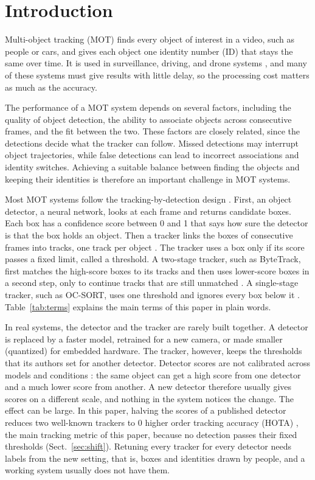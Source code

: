 \section{Introduction}\label{sec:intro}

Multi-object tracking (MOT) finds every object of interest in a video, such as people or cars,
and gives each object one identity number (ID) that stays the same over time. It is used in
surveillance, driving, and drone systems \cite{zhu2022visdrone,wu2022uavsurvey}, and many of these
systems must give results with little delay, so the processing cost matters as much as the
accuracy.

The performance of a MOT system depends on several factors, including the quality of object
detection, the ability to associate objects across consecutive frames, and the fit between the two.
These factors are closely related, since the detections decide what the tracker can follow. Missed
detections may interrupt object trajectories, while false detections can lead to incorrect
associations and identity switches. Achieving a suitable balance between finding the objects and
keeping their identities is therefore an important challenge in MOT systems.

Most MOT systems follow the tracking-by-detection design \cite{adzemovic2026survey}. First, an
object detector, a neural network, looks at each frame and returns candidate boxes. Each box has a
confidence score between 0 and 1 that says how sure the detector is that the box holds an object.
Then a tracker links the boxes of consecutive frames into tracks, one track per object
\cite{bewley2016sort,zhang2022bytetrack,cao2023ocsort}. The tracker uses a box only if its score
passes a fixed limit, called a threshold. A two-stage tracker, such as ByteTrack, first matches the
high-score boxes to its tracks and then uses lower-score boxes in a second step, only to continue
tracks that are still unmatched \cite{zhang2022bytetrack}. A single-stage tracker, such as OC-SORT,
uses one threshold and ignores every box below it \cite{cao2023ocsort}. Table~\ref{tab:terms}
explains the main terms of this paper in plain words.

In real systems, the detector and the tracker are rarely built together. A detector is replaced by
a faster model, retrained for a new camera, or made smaller (quantized) for embedded hardware. The
tracker, however, keeps the thresholds that its authors set for another detector. Detector scores
are not calibrated across models and conditions \cite{kuppers2020detcalib}: the same object can get
a high score from one detector and a much lower score from another. A new detector therefore
usually gives scores on a different scale, and nothing in the system notices the change. The effect
can be large. In this paper, halving the scores of a published detector reduces two well-known
trackers to 0 higher order tracking accuracy (HOTA) \cite{luiten2021hota}, the main tracking metric
of this paper, because no detection passes their fixed thresholds (Sect.~\ref{sec:shift}).
Retuning every tracker for every detector needs labels from the new setting, that is, boxes and
identities drawn by people, and a working system usually does not have them.

